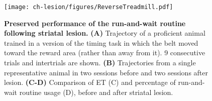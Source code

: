 \begin{figure}[bth!]
 \begin{center}
	\texttt{[image: ch-lesion/figures/ReverseTreadmill.pdf]}
	\caption[]
	{\textbf{Preserved performance of the run-and-wait routine following striatal lesion.}
	\textbf{(A)} Trajectory of a proficient animal trained in a version of the timing task in which the belt moved toward the reward area (rather than away from it). 9 consecutive trials and intertrials are shown.
	\textbf{(B)} Trajectories from a single representative animal in two sessions before and two sessions after lesion.
	\textbf{(C-D)} Comparison of ET (C) and percentage of run-and-wait routine usage (D), before and after striatal lesion.
	}
	\label{fig:lesion:rev}
 \end{center}
\end{figure}